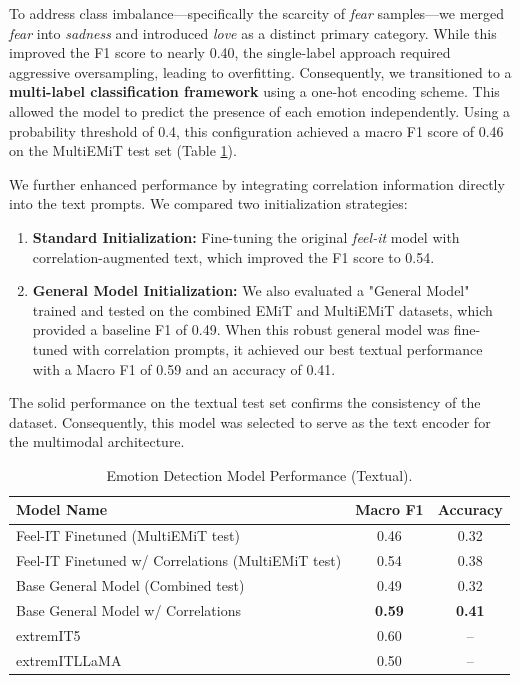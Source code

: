 \documentclass[letterpaper,journal]{IEEEtran}
\begin{document}
To address class imbalance—specifically the scarcity of \textit{fear} samples—we merged \textit{fear} into \textit{sadness} and introduced \textit{love} as a distinct primary category. While this improved the F1 score to nearly 0.40, the single-label approach required aggressive oversampling, leading to overfitting. Consequently, we transitioned to a \textbf{multi-label classification framework} using a one-hot encoding scheme. This allowed the model to predict the presence of each emotion independently. Using a probability threshold of 0.4, this configuration achieved a macro F1 score of 0.46 on the MultiEMiT test set (Table \ref{table:emotion}).

We further enhanced performance by integrating correlation information directly into the text prompts. We compared two initialization strategies:
\begin{enumerate}
    \item \textbf{Standard Initialization:} Fine-tuning the original \textit{feel-it} model with correlation-augmented text, which improved the F1 score to 0.54.
    \item \textbf{General Model Initialization:} We also evaluated a "General Model" trained and tested on the combined EMiT and MultiEMiT datasets, which provided a baseline F1 of 0.49. When this robust general model was fine-tuned with correlation prompts, it achieved our best textual performance with a Macro F1 of 0.59 and an accuracy of 0.41.
\end{enumerate}

The solid performance on the textual test set confirms the consistency of the dataset. Consequently, this model was selected to serve as the text encoder for the multimodal architecture.

\begin{table}[htb!]
\begin{center}
{\footnotesize
\begin{tabular}{l|c|c}
\hline
\textbf{Model Name} & \textbf{Macro F1} & \textbf{Accuracy} \\
\hline
Feel-IT Finetuned (MultiEMiT test) & 0.46 & 0.32 \\
Feel-IT Finetuned w/ Correlations (MultiEMiT test) & 0.54 & 0.38 \\
Base General Model (Combined test) & 0.49 & 0.32 \\
Base General Model w/ Correlations & \textbf{0.59} & \textbf{0.41} \\
extremIT5 & 0.60 & -- \\
extremITLLaMA & 0.50 & -- \\
\hline
\end{tabular}
}
\end{center}
\setlength{\belowcaptionskip}{-0.1cm}
\caption{Emotion Detection Model Performance (Textual).}
\label{table:emotion}
\end{table}
\end{document}
